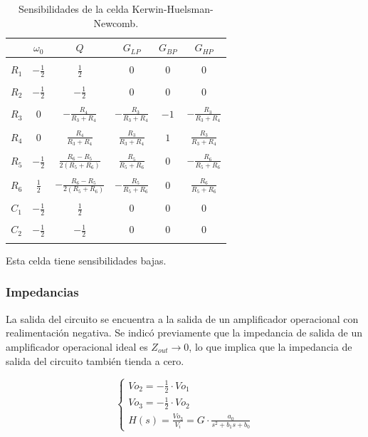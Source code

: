 \begin{table}[H]
	\centering
	\begin{tabular}{c c c c c c}
		  & $\omega_0$ & $Q$ &$G_{LP}$ & $G_{BP}$& $G_{HP}$\\
		\hline \\
	$R_1$ & $-\frac{1}{2}$& $\frac{1}{2}$ & $0$& $0$&$0$\\ \\
	$R_2$ & $-\frac{1}{2}$& $-\frac{1}{2}$ & $0$& $0$& $0$\\ \\
	$R_3$ & $0$& $-\frac{R_4}{R_3+R_4}$ & $-\frac{R_3}{R_3+R_4}$&$-1$ & $-\frac{R_3}{R_3+R_4}$\\ \\
	$R_4$ & $0$& $\frac{R_4}{R_3+R_4}$& $\frac{R_3}{R_3+R_4}$ &$1$ & $\frac{R_3}{R_3+R_4}$\\ \\
	$R_5$ & $-\frac{1}{2}$&$\frac{R_6-R_5}{2(R_5+R_6)}$ & $\frac{R_5}{R_5+R_6}$&$0$ & $-\frac{R_6}{R_5+R_6}$\\ \\
	$R_6$ & $\frac{1}{2}$& $-\frac{R_6-R_5}{2(R_5+R_6)}$ & $-\frac{R_5}{R_5+R_6}$& $0$&$\frac{R_6}{R_5+R_6}$ \\ \\
	$C_1$ & $-\frac{1}{2}$& $\frac{1}{2}$ & $0$& $0$&$0$ \\ \\
	$C_2$ & $-\frac{1}{2}$& $-\frac{1}{2}$ & $0$ & $0$&$0$\\ \\
		\hline
	\end{tabular}
	\caption{Sensibilidades de la celda Kerwin-Huelsman-Newcomb.}
	\label{sens_k}
\end{table}


Esta celda tiene sensibilidades bajas.


\subsubsection{Impedancias}
La salida del circuito se encuentra a la salida de un amplificador operacional con realimentaci\'on negativa.  Se indic\'o previamente que la impedancia de salida de un amplificador operacional ideal es $Z_{out} \to 0$, lo que implica que la impedancia de salida del circuito tambi\'en tienda a cero.

\begin{equation}
\begin{cases}
Vo_2 = -\frac{1}{2} \cdot Vo_1\\
Vo_3 = -\frac{1}{2} \cdot Vo_2\\
H(s) = \frac{Vo_3}{V_i} = G \cdot \frac{a_0}{s^2 + b_1 s + b_0}
\label{int2eq}
\end{cases}
\end{equation}

